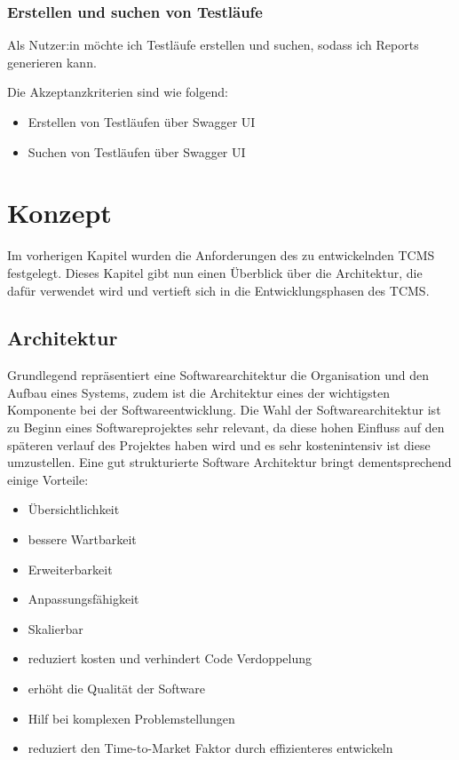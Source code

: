 \documentclass[a4paper, fontsize=11pt, parskip=half, twoside]{scrreprt}
\begin{document}
	\subsection{Erstellen und suchen von Testläufe}
	Als Nutzer:in möchte ich Testläufe erstellen und suchen, sodass ich Reports generieren kann.
	
	Die Akzeptanzkriterien sind wie folgend:
	\begin{itemize}
		\item Erstellen von Testläufen über Swagger \ac{UI}
		\item Suchen von Testläufen über Swagger \ac{UI}
	\end{itemize}
	
	
	
	\chapter{Konzept}
	Im vorherigen Kapitel wurden die Anforderungen des zu entwickelnden \ac{TCMS} festgelegt.
	Dieses Kapitel gibt nun einen Überblick über die Architektur, die dafür verwendet wird und vertieft sich in die Entwicklungsphasen des \ac{TCMS}.
	
	\section{Architektur}
	Grundlegend repräsentiert eine Softwarearchitektur die Organisation und den Aufbau eines Systems, zudem ist die Architektur eines der wichtigsten Komponente bei der Softwareentwicklung.
	Die Wahl der Softwarearchitektur ist zu Beginn eines Softwareprojektes sehr relevant, da diese hohen Einfluss auf den späteren verlauf des Projektes haben wird und es sehr kostenintensiv ist diese umzustellen.
	Eine gut strukturierte Software Architektur bringt dementsprechend einige Vorteile:
	
	\begin{itemize}
		\item Übersichtlichkeit
		\item bessere Wartbarkeit
		\item Erweiterbarkeit
		\item Anpassungsfähigkeit
		\item Skalierbar
		\item reduziert kosten und verhindert Code Verdoppelung
		\item erhöht die Qualität der Software
		\item Hilf bei komplexen Problemstellungen
		\item reduziert den Time-to-Market Faktor durch effizienteres entwickeln
	\end{itemize}
	
\end{document}
